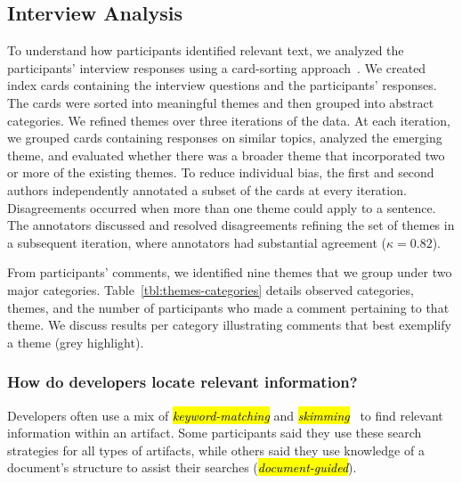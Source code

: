 
\subsection{Interview Analysis}

To understand how participants identified relevant text, we analyzed the participants'
interview responses using a card-sorting approach~\cite{spencer2009sorting}.
We created index cards containing the interview questions and the participants' responses.
The cards were sorted into meaningful themes and then grouped into abstract categories.
We refined themes over three iterations of the data.
At each  iteration, we grouped cards containing responses on similar topics, analyzed the emerging theme, and evaluated
whether there was a broader theme that incorporated two or more of the existing themes.
To reduce individual bias, the first and second authors independently annotated a subset of the cards at every iteration.
Disagreements occurred when more than one theme could apply to a sentence.
The annotators discussed and resolved disagreements refining the set of themes in a subsequent iteration, where annotators had substantial agreement ($\kappa=0.82$).





From participants' comments, we identified nine themes that we group under two major categories.
Table~\ref{tbl:themes-categories} details observed categories, themes, and the number of participants who made a comment pertaining to that theme.
We discuss results per category illustrating comments that best exemplify a theme (grey highlight).










\subsubsection{How do developers locate relevant information?}
\label{cp3:search-strategies}

Developers often use a mix of \hl{\textit{keyword-matching}} and \hl{\textit{skimming}}~\cite{Starke2009, Ko2006a} to find relevant information within an artifact. 
Some participants said they use these search strategies for all types of artifacts, while others said they use knowledge of a document's structure to assist their searches (\hl{\textit{document-guided}}).


